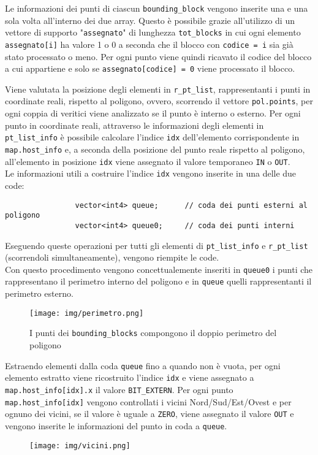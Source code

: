 			Le informazioni dei punti di ciascun \texttt{bounding\_block} vengono inserite una e una sola volta all'interno dei due array. Questo \`{e} possibile grazie all'utilizzo di un vettore di supporto "\texttt{assegnato}" di lunghezza \texttt{tot\_blocks} in cui ogni elemento \texttt{assegnato[i]} ha valore 1 o 0 a seconda che il blocco con \texttt{codice = i} sia gi\`{a} stato processato o meno.
			Per ogni punto viene quindi ricavato il codice del blocco a cui appartiene e solo se \texttt{assegnato[codice] = 0} viene processato il blocco.

			Viene valutata la posizione degli elementi in \texttt{r\_pt\_list}, rappresentanti i punti in coordinate reali, rispetto al poligono, ovvero, scorrendo il vettore \texttt{pol.points}, per ogni coppia di veritici viene analizzato se il punto \`{e} interno o esterno. Per ogni punto in coordinate reali, attraverso le informazioni degli elementi in \texttt{pt\_list\_info} \`{e} possibile calcolare l'indice \texttt{idx} dell'elemento corrispondente in \texttt{map.host\_info} e, a seconda della  posizione del punto reale rispetto al poligono, all'elemento in posizione \texttt{idx} viene assegnato il valore temporaneo \texttt{IN} o \texttt{OUT}.\\
			Le informazioni utili a costruire l'indice \texttt{idx} vengono inserite in una delle due code:
			\begin{verbatim}
				vector<int4> queue;      // coda dei punti esterni al poligono
				vector<int4> queue0;     // coda dei punti interni
			\end{verbatim} 
			Eseguendo queste operazioni per tutti gli elementi di \texttt{pt\_list\_info} e \texttt{r\_pt\_list} (scorrendoli simultaneamente), vengono riempite le code.\\
			Con questo procedimento vengono concettualemente inseriti in \texttt{queue0} i punti che rappresentano il perimetro interno del poligono e in \texttt{queue} quelli rappresentanti il perimetro esterno.
			\begin{figure}[htbp]
				\centering
				\texttt{[image: img/perimetro.png]}
				\caption{I punti dei \texttt{bounding\_blocks} compongono il doppio perimetro del poligono}
			\end{figure}
			
			Estraendo elementi dalla coda \texttt{queue} fino a quando non \`{e} vuota, per ogni elemento estratto viene ricostruito l'indice \texttt{idx} e viene assegnato a \texttt{map.host\_info[idx].x} il valore \texttt{BIT\_EXTERN}. Per ogni punto \texttt{map.host\_info[idx]} vengono controllati i vicini Nord/Sud/Est/Ovest e per ognuno dei vicini, se il valore \`{e} uguale a \texttt{ZERO}, viene assegnato il valore \texttt{OUT} e vengono inserite le informazioni del punto in coda a \texttt{queue}.
			\begin{figure}[htbp]
				\centering
				\texttt{[image: img/vicini.png]}
			\end{figure}

